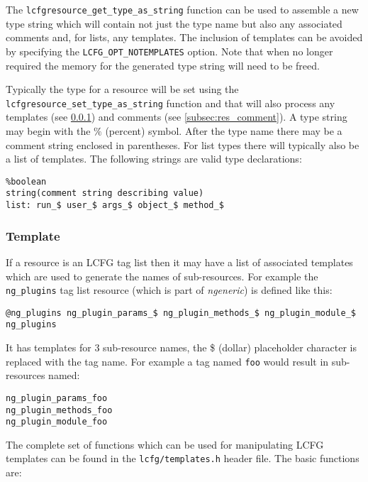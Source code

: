 \documentclass[11pt,a4paper,titlepage]{article}
\begin{document}
The \texttt{lcfgresource\_get\_type\_as\_string} function can be used
to assemble a new type string which will contain not just the type
name but also any associated comments and, for lists, any
templates. The inclusion of templates can be avoided by specifying the
\texttt{LCFG\_OPT\_NOTEMPLATES} option. Note that when no longer
required the memory for the generated type string will need to be
freed.

Typically the type for a resource will be set using the
\texttt{lcfgresource\_set\_type\_as\_string} function and that will
also process any templates (see \ref{subsec:res_template}) and comments (see
\ref{subsec:res_comment}). A type string may begin with the $\%$ (percent)
symbol. After the type name there may be a comment string enclosed in
parentheses. For list types there will typically also be a list of
templates. The following strings are valid type declarations:

\begin{verbatim}
%boolean
string(comment string describing value)
list: run_$ user_$ args_$ object_$ method_$
\end{verbatim}

\subsubsection{Template}
\label{subsec:res_template}

If a resource is an LCFG tag list then it may have a list of
associated templates which are used to generate the names of
sub-resources. For example the \texttt{ng\_plugins} tag list resource
(which is part of \textit{ngeneric}) is defined like this:

\begin{verbatim}
@ng_plugins ng_plugin_params_$ ng_plugin_methods_$ ng_plugin_module_$
ng_plugins
\end{verbatim}

It has templates for 3 sub-resource names, the \$ (dollar) placeholder
character is replaced with the tag name. For example a tag named
\texttt{foo} would result in sub-resources named:

\begin{verbatim}
ng_plugin_params_foo
ng_plugin_methods_foo
ng_plugin_module_foo
\end{verbatim}

The complete set of functions which can be used for manipulating LCFG
templates can be found in the \texttt{lcfg/templates.h} header
file. The basic functions are:
\end{document}
